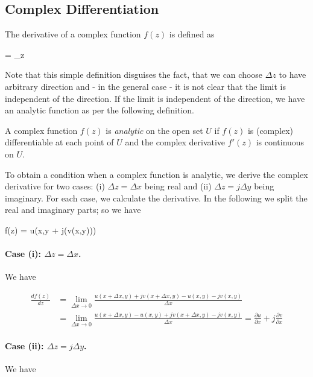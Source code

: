 
\subsection{Complex Differentiation}

The derivative of a complex function $f(z)$ is defined as

\bee
{} = \lim_{\Delta z } 
\eee

Note that this simple definition disguises the fact, that we can choose $\Delta z$ to have arbitrary direction and - in the general case - it is not clear that the limit is independent of the direction. If the limit is independent of the direction, we have an analytic function as per the following definition.

\begin{definition}
    A complex function $f(z)$ is \emph{analytic} on the open set $U$ if $f(z)$ is (complex) differentiable at each point of $U$ and the complex derivative $f'(z)$ is continuous on $U$.
\end{definition}

To obtain a condition when a complex function is analytic, we derive the complex derivative for two cases: (i) $\Delta z = \Delta x$ being real and (ii) $\Delta z = j \Delta y$ being imaginary. For each case, we calculate the derivative. In the following we split the real and imaginary parts; so we have

\bee
f(z) = u(x,y + j(v(x,y)))
\eee

\paragraph{Case (i): $\Delta z = \Delta x$.} We have

\begin{align*}
\frac{df(z)}{dz} &= \lim_{\Delta x \rightarrow 0} \frac{u(x + \Delta x, y) + j v(x + \Delta x, y) - u(x, y) - j v(x, y) }{\Delta x} \\
&= \lim_{\Delta x \rightarrow 0} \frac{u(x + \Delta x, y) - u(x, y) + j v(x + \Delta x, y)  - j v(x, y) }{\Delta x} = \frac{\partial u}{\partial x} + j \frac{\partial v}{\partial x}
\end{align*}


\paragraph{Case (ii): $\Delta z = j \Delta y$.} We have

